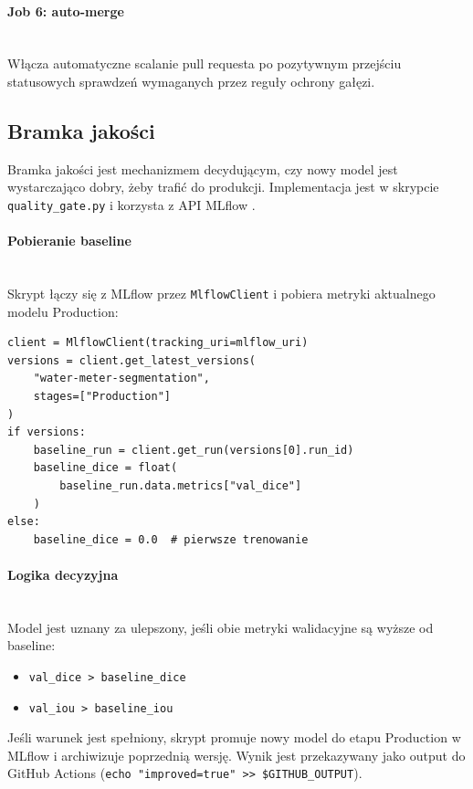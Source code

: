 \paragraph{Job 6: auto-merge}\mbox{}\\
Włącza automatyczne scalanie pull requesta po pozytywnym przejściu statusowych sprawdzeń wymaganych przez reguły ochrony gałęzi.

\subsection{Bramka jakości}

Bramka jakości jest mechanizmem decydującym, czy nowy model jest wystarczająco dobry, żeby trafić do produkcji. Implementacja jest w skrypcie \texttt{quality\_gate.py} i korzysta z API MLflow \cite{zaharia2018mlflow}.

\paragraph{Pobieranie baseline}\mbox{}\\
Skrypt łączy się z MLflow przez \texttt{MlflowClient} i pobiera metryki aktualnego modelu Production:

\begin{verbatim}
client = MlflowClient(tracking_uri=mlflow_uri)
versions = client.get_latest_versions(
    "water-meter-segmentation",
    stages=["Production"]
)
if versions:
    baseline_run = client.get_run(versions[0].run_id)
    baseline_dice = float(
        baseline_run.data.metrics["val_dice"]
    )
else:
    baseline_dice = 0.0  # pierwsze trenowanie
\end{verbatim}

\paragraph{Logika decyzyjna}\mbox{}\\
Model jest uznany za ulepszony, jeśli obie metryki walidacyjne są wyższe od baseline:

\begin{itemize}
  \item \texttt{val\_dice > baseline\_dice}
  \item \texttt{val\_iou > baseline\_iou}
\end{itemize}

Jeśli warunek jest spełniony, skrypt promuje nowy model do etapu Production w MLflow i archiwizuje poprzednią wersję. Wynik jest przekazywany jako output do GitHub Actions (\texttt{echo "improved=true" >> \$GITHUB\_OUTPUT}).

